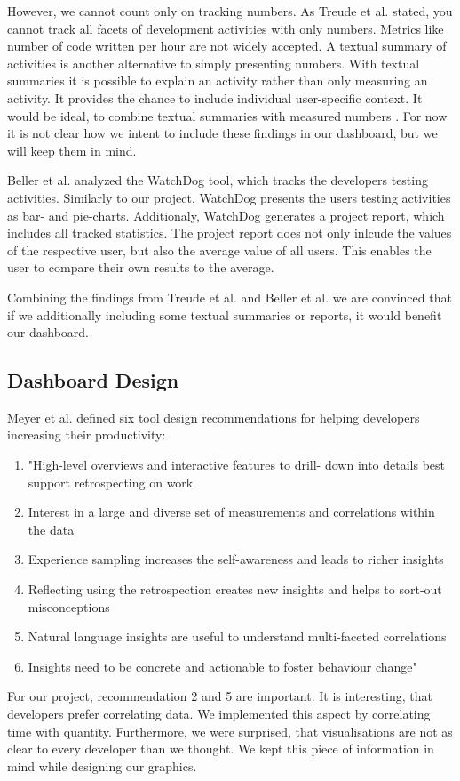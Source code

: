 \documentclass{seal_article}
\begin{document}
	However, we cannot count only on tracking numbers. As Treude et al. \cite{Treude:2015:SMD:2786805.2786827} stated, you cannot track all facets of development activities with only numbers. Metrics like number of code written per hour are not widely accepted. A textual summary of activities is another alternative to simply presenting numbers. With textual summaries it is possible to explain an activity rather than only measuring an activity. It provides the chance to include individual user-specific context. It would be ideal, to combine textual summaries with measured numbers \cite{Treude:2015:SMD:2786805.2786827}. For now it is not clear how we intent to include these findings in our dashboard, but we will keep them in mind.
	
	Beller et al. \cite{Beller:2016:CEW:2897022.2897027} analyzed the WatchDog tool, which tracks the developers testing activities. Similarly to our project, WatchDog presents the users testing activities as bar- and pie-charts. Additionaly, WatchDog generates a project report, which includes all tracked statistics. The project report does not only inlcude the values of the respective user, but also the average value of all users. This enables the user to compare their own results to the average. 
	
	Combining the findings from Treude et al. \cite{Treude:2015:SMD:2786805.2786827} and Beller et al. \cite{Beller:2016:CEW:2897022.2897027} we are convinced that if we additionally including some textual summaries or reports, it would benefit our dashboard. 
	
\subsection{Dashboard Design}

Meyer et al. \cite{Meyer:2017:DRS:3171581.3134714} defined six tool design recommendations for helping developers increasing their productivity:
\begin{enumerate}
	\item "High-level overviews and interactive features to drill- down into details best support retrospecting on work
	\item Interest in a large and diverse set of measurements and correlations within the data
	\item Experience sampling increases the self-awareness and leads to richer insights
	\item Reflecting using the retrospection creates new insights and helps to sort-out misconceptions
	\item Natural language insights are useful to understand multi-faceted correlations
	\item Insights need to be concrete and actionable to foster behaviour change" \cite[p. 2]{Meyer:2017:DRS:3171581.3134714}
\end{enumerate}
For our project, recommendation 2 and 5 are important. It is interesting, that developers prefer correlating data. We implemented this aspect by correlating time with quantity. Furthermore, we were surprised, that visualisations are not as clear to every developer than we thought. We kept this piece of information in mind while designing our graphics. 
\end{document}
